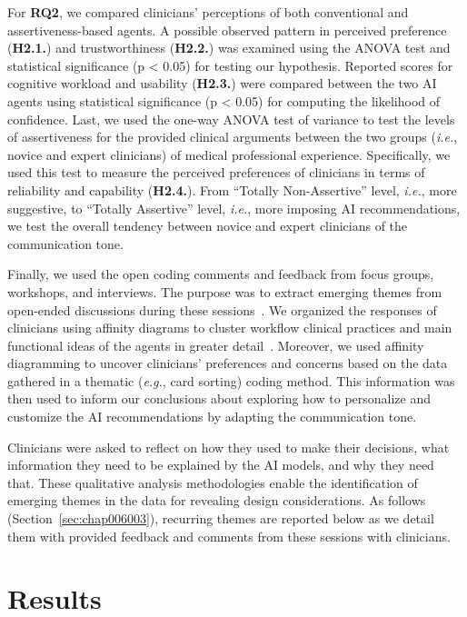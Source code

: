 For {\bf RQ2}, we compared clinicians' perceptions of both conventional and assertiveness-based agents.
A possible observed pattern in perceived preference ({\bf H2.1.}) and trustworthiness ({\bf H2.2.}) was examined using the ANOVA test and statistical significance (p < 0.05) for testing our hypothesis.
Reported scores for cognitive workload and usability ({\bf H2.3.}) were compared between the two AI agents using statistical significance (p < 0.05) for computing the likelihood of confidence.
Last, we used the one-way ANOVA test of variance to test the levels of assertiveness for the provided clinical arguments between the two groups ({\it i.e.}, novice and expert clinicians) of medical professional experience.
Specifically, we used this test to measure the perceived preferences of clinicians in terms of reliability and capability ({\bf H2.4.}).
From ``Totally Non-Assertive'' level, {\it i.e.}, more suggestive, to ``Totally Assertive'' level, {\it i.e.}, more imposing AI recommendations, we test the overall tendency between novice and expert clinicians of the communication tone.

Finally, we used the open coding comments and feedback from focus groups, workshops, and interviews.
The purpose was to extract emerging themes from open-ended discussions during these sessions~\cite{SHIBUYA2022107131, BIEG2022107249}.
We organized the responses of clinicians using affinity diagrams to cluster workflow clinical practices and main functional ideas of the agents in greater detail~\cite{DEUTSCH2019122, 10.1145/3491101.3519863}.
Moreover, we used affinity diagramming to uncover clinicians' preferences and concerns based on the data gathered in a thematic ({\it e.g.}, card sorting) coding method.
This information was then used to inform our conclusions about exploring how to personalize and customize the AI recommendations by adapting the communication tone.

Clinicians were asked to reflect on how they used to make their decisions, what information they need to be explained by the AI models, and why they need that.
These qualitative analysis methodologies enable the identification of emerging themes in the data for revealing design considerations.
As follows (Section~\ref{sec:chap006003}), recurring themes are reported below as we detail them with provided feedback and comments from these sessions with clinicians.

\section{Results}
\label{sec:chap006006}

